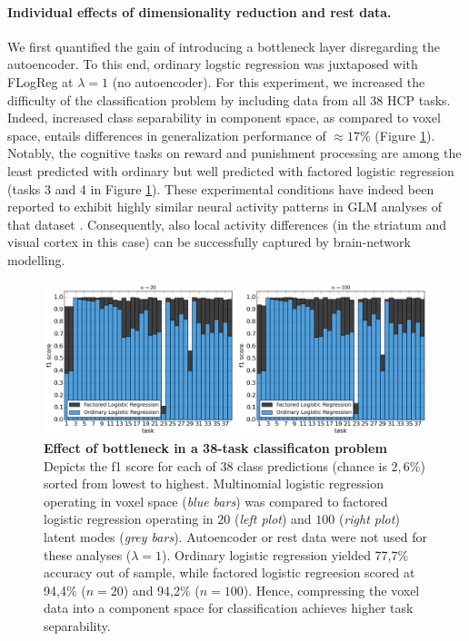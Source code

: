 \documentclass{article} %
\begin{document}
\paragraph{Individual effects of dimensionality reduction and rest data.}
We first quantified the gain of introducing a bottleneck layer
disregarding the autoencoder.
To this end, ordinary logstic regression was juxtaposed
with FLogReg  at $\lambda=1$ (no autoencoder).
For this experiment, we increased the difficulty of the classification problem
by including data from all 38 HCP tasks.
Indeed, increased class separability in component space,
as compared to voxel space, entails differences in
generalization performance of
$\approx{17\%}$ (Figure \ref{fig_dimred}).
%
Notably,
the cognitive tasks on reward and punishment processing
are among the least predicted with ordinary but well predicted with
factored logistic regression
(tasks 3 and 4 in Figure \ref{fig_dimred}).
These experimental conditions have indeed been reported to exhibit
highly similar neural activity patterns in
GLM analyses of that dataset \cite{barch2013}.
Consequently, also local activity differences
(in the striatum and visual cortex in this case) can
be successfully captured by brain-network modelling.
%
\begin{figure}
\begin{centering}
\includegraphics[width=1.00\textwidth]{figures/accuracies.pdf}
\end{centering}
\vspace{-0.5cm}
\caption{\textbf{Effect of bottleneck in a 38-task classificaton problem}
Depicts the f1 score for each of 38 class predictions (chance is  $2,6\%$)
sorted from lowest to highest.
Multinomial logistic regression operating in voxel space (\textit{blue bars})
was compared to 
factored logistic regression operating in $20$
(\textit{left plot}) and $100$ (\textit{right plot})
latent modes (\textit{grey bars}).
Autoencoder or rest data were not used for these analyses
($\lambda=1$).
Ordinary logistic regression yielded 77,7\% accuracy out of sample, while
factored logistic regreesion scored at 94,4\% ($n=20$) and 94,2\% ($n=100$).
Hence, compressing the voxel data into a component space for classification
achieves higher task separability.
}
\label{fig_dimred}
\end{figure}
\end{document}
